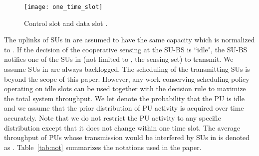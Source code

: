 \documentclass[conference]{IEEEtran}
\begin{document}
\begin{figure}[tb]
    \begin{center}
    \setlength{\unitlength}{1in}
    \texttt{[image: one\_time\_slot]}
    \end{center}
\vspace{-1.2em}
\caption{Control slot  and data slot .}
\vspace{-1.8em}
\label{fig:slot}
\end{figure}   

The uplinks of SUs in  are assumed to have the same capacity which is normalized to . If the decision of the cooperative sensing at the SU-BS is ``idle", the SU-BS notifies one of the SUs in  (not limited to , the sensing set) to transmit. We assume SUs in  are always backlogged. The scheduling of the transmitting SUs is beyond the scope of this paper. However, any work-conserving scheduling policy operating on idle slots can be used together with the decision rule to maximize the total system throughput. We let  denote the probability that the PU is idle and we assume that the prior distribution of PU activity is acquired over time accurately. Note that we do not restrict the PU activity to any specific distribution except that it does not change within one time slot. The average throughput of PUs whose transmission would be interfered by SUs in  is denoted as . Table~\ref{tab:not} summarizes the notations used in the paper.
\end{document}

